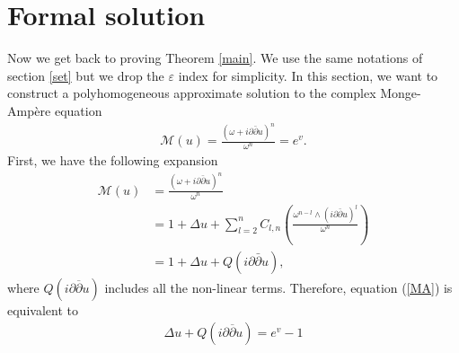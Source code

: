 \documentclass[a4paper,11pt]{article}
\begin{document}
\section{Formal solution} \label{secform}
Now we get back to proving Theorem \ref{main}. We use the same notations of section \ref{set} but we drop the $\varepsilon$ index for simplicity. In this section, we want to construct a polyhomogeneous approximate solution to the complex Monge-Ampère equation 
\begin{align} \label{MA}
\mathcal{M}(u) =  \frac{\left( \omega + i \partial \bar \partial u \right)^n}{\omega^n} = e^{v}.
\end{align}
First, we have the following expansion 
  \begin{align*}
 \mathcal{M}(u) & = \frac{\left( \omega + i \partial \bar \partial u \right)^n}{\omega^n} \\   & =1 + \Delta u + \sum_{l=2}^{n} C_{l,n} \left( \frac{\omega^{n-l} \wedge (i \partial \bar \partial u )^l}{\omega^{n}} \right) \\ & = 1 + \Delta u + Q(i \partial \bar \partial u), 
 \end{align*}
where $Q(i \partial \overline{\partial} u)$ includes all the non-linear terms. Therefore, equation (\ref{MA}) is equivalent to 
\begin{align} \label{MA2}
\Delta u + Q(i \partial \overline{\partial} u)= e^{v} -1
\end{align}
\end{document}

